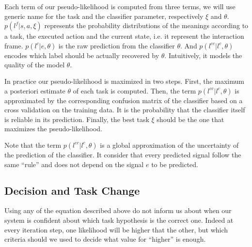 Each term of our pseudo-likelihood is computed from three terms, we will use generic name for the task and the classifier parameter, respectively $\xi$ and $\theta$. $p(l^f|s,a,\xi)$ represents the probability distributions of the meanings according to a task, the executed action and the current state, i.e. it represent the interaction frame. $p(l^c | e, \theta)$ is the raw prediction from the classifier $\theta$. And $p(l^{cc} | l^c, \theta)$ encodes which label should be actually recovered by $\theta$. Intuitively, it models the quality of the model $\theta$.

In practice our pseudo-likelihood is maximized in two steps. First, the maximum a posteriori estimate $\theta$ of each task is computed. Then, the term $p(l^{cc} | l^c, \theta)$ is approximated by the corresponding confusion matrix of the classifier based on a cross validation on the training data. It is the probability that the classifier itself is reliable in its prediction. Finally, the best task $\xi$ should be the one that maximizes the pseudo-likelihood.

Note that the term $p(l^{cc} | l^c, \theta)$ is a global approximation of the uncertainty of the prediction of the classifier. It consider that every predicted signal follow the same ``rule'' and does not depend on the signal $e$ to be predicted. 



\subsection{Decision and Task Change}

Using any of the equation described above do not inform us about when our system is confident about which task hypothesis is the correct one. Indeed at every iteration step, one likelihood will be higher that the other, but which criteria should we used to decide what value for ``higher'' is enough.


